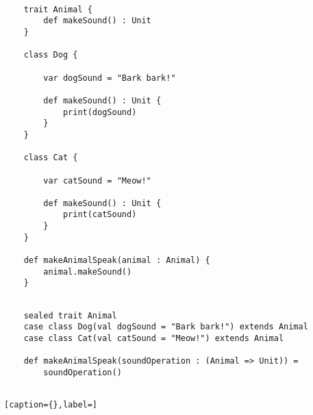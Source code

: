 
\begin{lstlisting}[caption={Interfaces em Orientação a Objetos},label=oopinterface2]
    
    trait Animal {
        def makeSound() : Unit
    }

    class Dog {

        var dogSound = "Bark bark!"

        def makeSound() : Unit {
            print(dogSound)
        }
    }

    class Cat {

        var catSound = "Meow!"

        def makeSound() : Unit {
            print(catSound)
        }
    }

    def makeAnimalSpeak(animal : Animal) {
        animal.makeSound()
    }

\end{lstlisting}


\begin{lstlisting}[caption={Interfaces em Programação Funcional},label=fpinterface2]
    
    sealed trait Animal
    case class Dog(val dogSound = "Bark bark!") extends Animal
    case class Cat(val catSound = "Meow!") extends Animal

    def makeAnimalSpeak(soundOperation : (Animal => Unit)) =
        soundOperation()
    

\end{lstlisting}









\begin{lstlisting}[caption={},label=]
    
    

\end{lstlisting}







